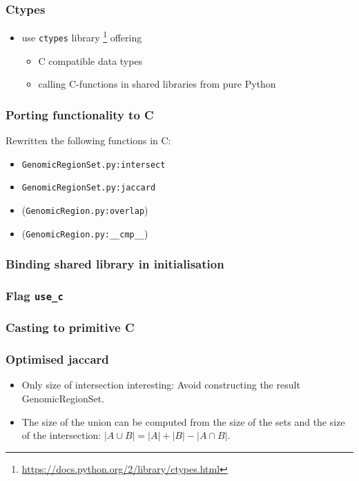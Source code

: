 \begin{frame}%
	\frametitle{Ctypes}
	\begin{itemize}
		\item use \texttt{ctypes} library \footnote{\url{https://docs.python.org/2/library/ctypes.html}} offering
		\begin{itemize}
			\item C compatible data types
			\item calling C-functions in shared libraries from pure Python
		\end{itemize}
	\end{itemize}
\end{frame}

\begin{frame}%
	\frametitle{Porting functionality to C}
	Rewritten the following functions in C:
	\begin{itemize}
		\item \texttt{GenomicRegionSet.py:intersect}
		\item \texttt{GenomicRegionSet.py:jaccard}
		\item (\texttt{GenomicRegion.py:overlap})
		\item (\texttt{GenomicRegion.py:\_\_cmp\_\_})
	\end{itemize}
\end{frame}


\begin{frame}
	\frametitle{Binding shared library in initialisation}
	
\end{frame}

\begin{frame}
	\frametitle{Flag \texttt{use\_c}}
		
		
\end{frame}


\begin{frame}
	\frametitle{Casting to primitive C}
	
\end{frame}


\begin{frame}
	\frametitle{Optimised jaccard}
	\begin{itemize}
		\item Only size of intersection interesting: Avoid constructing the result GenomicRegionSet.
		\item The size of the union can be computed from the size of the sets and the size of the intersection: $|A \cup B| = |A| + |B| - |A \cap B|$.
	\end{itemize}
\end{frame}